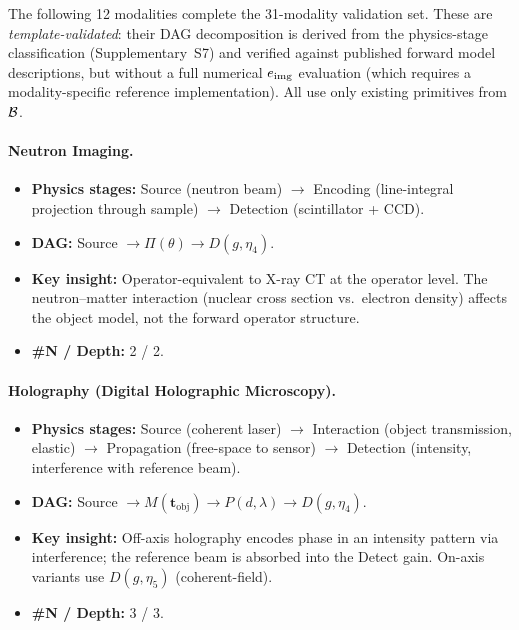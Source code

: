\medskip
The following 12 modalities complete the 31-modality validation set. These are \emph{template-validated}: their DAG decomposition is derived from the physics-stage classification (Supplementary~S7) and verified against published forward model descriptions, but without a full numerical $e_{\mathrm{img}}$ evaluation (which requires a modality-specific reference implementation). All use only existing primitives from $\mathcal{B}$.

\paragraph{Neutron Imaging.}
\begin{itemize}
  \item \textbf{Physics stages:} Source (neutron beam) $\to$ Encoding (line-integral projection through sample) $\to$ Detection (scintillator + CCD).
  \item \textbf{DAG:} Source $\to \Pi(\theta) \to D(g, \eta_4)$.
  \item \textbf{Key insight:} Operator-equivalent to X-ray CT at the operator level. The neutron--matter interaction (nuclear cross section vs.\ electron density) affects the object model, not the forward operator structure.
  \item \textbf{\#N / Depth:} 2 / 2.
\end{itemize}

\paragraph{Holography (Digital Holographic Microscopy).}
\begin{itemize}
  \item \textbf{Physics stages:} Source (coherent laser) $\to$ Interaction (object transmission, elastic) $\to$ Propagation (free-space to sensor) $\to$ Detection (intensity, interference with reference beam).
  \item \textbf{DAG:} Source $\to M(\mathbf{t}_{\mathrm{obj}}) \to P(d, \lambda) \to D(g, \eta_4)$.
  \item \textbf{Key insight:} Off-axis holography encodes phase in an intensity pattern via interference; the reference beam is absorbed into the Detect gain. On-axis variants use $D(g, \eta_5)$ (coherent-field).
  \item \textbf{\#N / Depth:} 3 / 3.
\end{itemize}

